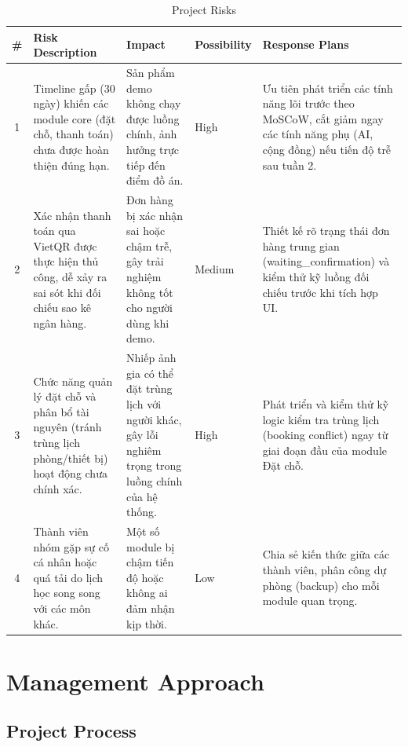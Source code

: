 \begin{table}[H]
	\centering
	\small
	\caption{Project Risks}
	\begin{tabularx}{\textwidth}{|c|Y|Y|L{1.8cm}|Y|}
		\hline
		\textbf{\#} &
		\textbf{Risk Description} &
		\textbf{Impact} &
		\textbf{Possibility} &
		\textbf{Response Plans} \\ \hline
		
		1 &
		Timeline gấp (30 ngày) khiến các module core (đặt chỗ, thanh toán) chưa được hoàn thiện đúng hạn. &
		Sản phẩm demo không chạy được luồng chính, ảnh hưởng trực tiếp đến điểm đồ án. &
		High &
		Ưu tiên phát triển các tính năng lõi trước theo MoSCoW, cắt giảm ngay các tính năng phụ (AI, cộng đồng) nếu tiến độ trễ sau tuần 2. \\ \hline
		
		2 &
		Xác nhận thanh toán qua VietQR được thực hiện thủ công, dễ xảy ra sai sót khi đối chiếu sao kê ngân hàng. &
		Đơn hàng bị xác nhận sai hoặc chậm trễ, gây trải nghiệm không tốt cho người dùng khi demo. &
		Medium &
		Thiết kế rõ trạng thái đơn hàng trung gian (waiting\_confirmation) và kiểm thử kỹ luồng đối chiếu trước khi tích hợp UI. \\ \hline
		
		3 &
		Chức năng quản lý đặt chỗ và phân bổ tài nguyên (tránh trùng lịch phòng/thiết bị) hoạt động chưa chính xác. &
		Nhiếp ảnh gia có thể đặt trùng lịch với người khác, gây lỗi nghiêm trọng trong luồng chính của hệ thống. &
		High &
		Phát triển và kiểm thử kỹ logic kiểm tra trùng lịch (booking conflict) ngay từ giai đoạn đầu của module Đặt chỗ. \\ \hline
		
		4 &
		Thành viên nhóm gặp sự cố cá nhân hoặc quá tải do lịch học song song với các môn khác. &
		Một số module bị chậm tiến độ hoặc không ai đảm nhận kịp thời. &
		Low &
		Chia sẻ kiến thức giữa các thành viên, phân công dự phòng (backup) cho mỗi module quan trọng. \\ \hline
		
	\end{tabularx}
\end{table}


\section{Management Approach}

\subsection{Project Process}

